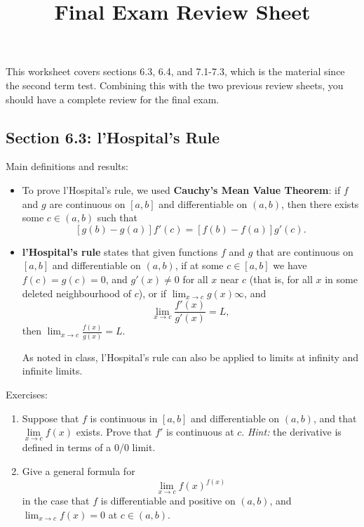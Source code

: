 \documentclass[letterpaper,12pt]{article}
\title{Final Exam Review Sheet}
\begin{document}
\maketitle

This worksheet covers sections 6.3, 6.4, and 7.1-7.3, which is the material since the second term test. Combining this with the two previous review sheets, you should have a complete review for the final exam.

\subsection*{Section 6.3: l'Hospital's Rule}
Main definitions and results:
\begin{itemize}
 \item To prove l'Hospital's rule, we used {\bf Cauchy's Mean Value Theorem}: if $f$ and $g$ are continuous on $[a,b]$ and differentiable on $(a,b)$, then there exists some $c\in (a,b)$ such that
\[
 [g(b)-g(a)]f'(c)=[f(b)-f(a)]g'(c).
\]
 \item {\bf l'Hospital's rule} states that given functions $f$ and $g$ that are continuous on $[a,b]$ and differentiable on $(a,b)$, if at some $c\in [a,b]$ we have $f(c)=g(c)=0$, and $g'(x)\neq 0$ for all $x$ near $c$ (that is, for all $x$ in some deleted neighbourhood of $c$), or if $\lim_{x\to c}g(x)\infty$, and
\[
 \lim_{x\to c}\frac{f'(x)}{g'(x)} = L,
\]
then $\displaystyle \lim_{x\to c}\frac{f(x)}{g(x)} = L$.

As noted in class, l'Hospital's rule can also be applied to limits at infinity and infinite limits.
\end{itemize}

\noindent Exercises:
\begin{enumerate}
 \item Suppose that $f$ is continuous in $[a,b]$ and differentiable on $(a,b)$, and that $\lim\limits_{x\to c}f(x)$ exists. Prove that $f'$ is continuous at $c$. {\em Hint:} the derivative is defined in terms of a 0/0 limit.
 \item Give a general formula for 
\[
 \lim_{x\to c}f(x)^{f(x)}
\]
in the case that $f$ is differentiable and positive on $(a,b)$, and $\lim_{x\to c}f(x)=0$ at $c\in (a,b)$.
\end{enumerate}
\end{document}
